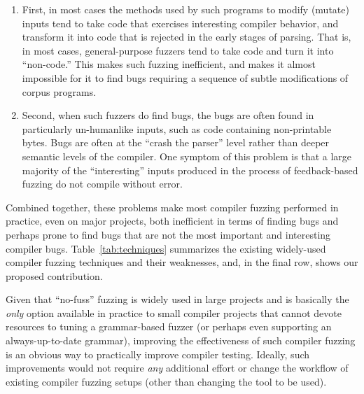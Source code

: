 \begin{enumerate}
\item First, in most cases the methods used by such programs to modify
  (mutate) inputs tend to take code that exercises interesting
  compiler behavior, and transform it into code that is rejected in
  the early stages of parsing.  That is, in most cases,
  general-purpose fuzzers tend to take code and turn it into
  ``non-code.''  This makes such fuzzing inefficient, and makes it
  almost impossible for it to find bugs requiring a sequence of subtle
  modifications of corpus programs.
  \item Second, when such fuzzers do find bugs, the bugs are often
    found in particularly un-humanlike inputs, such as code
    containing non-printable bytes.  Bugs are often at the ``crash the
    parser'' level rather than deeper semantic levels of the
    compiler.  One symptom of this problem is that a large majority of
    the ``interesting'' inputs produced in the process of
    feedback-based fuzzing do not compile without error.
  \end{enumerate}

  Combined together, these problems make most compiler fuzzing
  performed in practice, even on major projects, both inefficient in
  terms of finding bugs and perhaps prone to find bugs that are not
  the most important and interesting compiler bugs.
  Table~\ref{tab:techniques} summarizes the existing widely-used
  compiler fuzzing techniques and their weaknesses, and, in the final
  row, shows our proposed contribution.

  Given that ``no-fuss'' fuzzing is widely used in large projects and
  is basically the \emph{only} option available in
  practice to small compiler projects that cannot devote resources to
  tuning a grammar-based fuzzer (or perhaps even supporting an
  always-up-to-date grammar), improving the effectiveness of such
  compiler fuzzing is an obvious way to practically improve compiler
  testing.  Ideally, such improvements would not require \emph{any}
  additional effort or change the workflow of existing compiler
  fuzzing setups (other than changing the  tool to be used).

